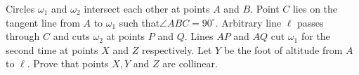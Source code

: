 Circles $\omega_1$ and $\omega_2$ intersect each other at points $A$ and $B$. Point $C$ lies on the tangent line from $A$ to $\omega_1$ such that$\angle ABC = 90^\circ$. Arbitrary line $\ell$ passes through $C$ and cuts $\omega_2$ at points $P$ and $Q$. Lines $AP$ and $AQ$ cut $\omega_1$ for the second time at points $X$ and $Z$ respectively. Let $Y$ be the foot of altitude from $A$ to $\ell$. Prove that points $X, Y$ and $Z$ are collinear.